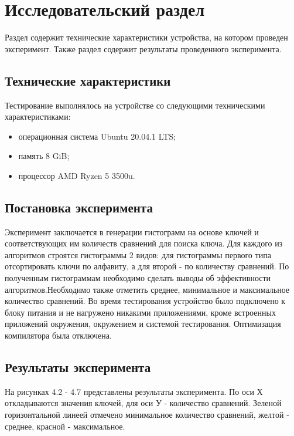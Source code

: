 \chapter{Исследовательский раздел}\label{sec:exp}
Раздел содержит технические характеристики устройства, на котором проведен эксперимент. Также раздел содержит результаты проведенного эксперимента.
\section{Технические характеристики}
Тестирование выполнялось на устройстве со следующими техническими характеристиками:
\begin{itemize}
	\item операционная система Ubuntu 20.04.1 LTS; \cite{linux}
	\item память 8 GiB;
	\item процессор AMD Ryzen 5 3500u.\cite{ryzen}
\end{itemize}

\section{Постановка эксперимента}
Эксперимент заключается в генерации гистограмм на основе клю­чей и соответствующих им количеств сравнений для поиска ключа.
Для каждого из алгоритмов строятся гистограммы 2 видов: для гистограммы первого типа отсортировать ключи по алфавиту, а для вто­рой - по количеству сравнений.
По полученным гистограммам необходимо сделать выводы об эф­фективности алгоритмов.Необходимо также отметить среднее, минимальное и максималь­ное количество сравнений.
Во время тестирования устройство было подключено к блоку питания и не нагружено никакими приложениями, кроме встроенных приложений окружения, окружением и системой тестирования. Оптимизация компилятора была отключена.

\section{Результаты эксперимента}
На рисунках 4.2 - 4.7 представлены результаты эксперимента.
По оси Х откладываются значения ключей, для оси У - количество сравнений.
Зеленой горизонтальной линеей отмечено минимальное количе­ство сравнений, желтой - среднее, красной - максимальное.

